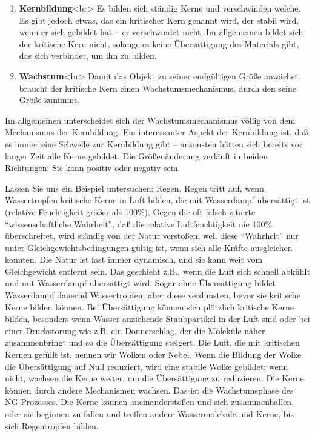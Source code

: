 \begin{enumerate}[label={\arabic*.}] 
\item \textbf{Kernbildung}<br>
Es bilden sich ständig Kerne und verschwinden welche.
Es gibt jedoch etwas, das ein kritischer Kern genannt wird, der stabil wird, wenn er sich gebildet hat -- er verschwindet nicht.
Im allgemeinen bildet sich der kritische Kern nicht, solange es keine Übersättigung des Materials gibt, das sich verbindet, um ihn zu bilden.

\item \textbf{Wachstum}<br>
Damit das Objekt zu seiner endgültigen Größe anwächst, braucht der kritische Kern einen Wachstumsmechanismus, durch den seine Größe zunimmt.
\end{enumerate}

Im allgemeinen unterscheidet sich der Wachstumsmechanismus völlig von dem Mechanismus der Kernbildung.
Ein interessanter Aspekt der Kernbildung ist, daß es immer eine Schwelle zur Kernbildung gibt -- ansonsten hätten sich bereits vor langer Zeit alle Kerne gebildet.
Die Größenänderung verläuft in beiden Richtungen: Sie kann positiv oder negativ sein.

Lassen Sie uns ein Beispiel untersuchen: Regen.
Regen tritt auf, wenn Wassertropfen kritische Kerne in Luft bilden, die mit Wasserdampf übersättigt ist (relative Feuchtigkeit größer als 100\%).
Gegen die oft falsch zitierte \enquote{wissenschaftliche Wahrheit}, daß die relative Luftfeuchtigkeit nie 100\% überschreitet, wird ständig von der Natur verstoßen, weil diese \enquote{Wahrheit} nur unter Gleichgewichtsbedingungen gültig ist, wenn sich alle Kräfte ausgleichen konnten.
Die Natur ist fast immer dynamisch, und sie kann weit vom Gleichgewicht entfernt sein.
Das geschieht z.B., wenn die Luft sich schnell abkühlt und mit Wasserdampf übersättigt wird.
Sogar ohne Übersättigung bildet Wasserdampf dauernd Wassertropfen, aber diese verdunsten, bevor sie kritische Kerne bilden können.
Bei Übersättigung können sich plötzlich kritische Kerne bilden, besonders wenn Wasser anziehende Staubpartikel in der Luft sind oder bei einer Druckstörung wie z.B. ein Donnerschlag, der die Moleküle näher zusammenbringt und so die Übersättigung steigert.
Die Luft, die mit kritischen Kernen gefüllt ist, nennen wir Wolken oder Nebel.
Wenn die Bildung der Wolke die Übersättigung auf Null reduziert, wird eine stabile Wolke gebildet; wenn nicht, wachsen die Kerne weiter, um die Übersättigung zu reduzieren.
Die Kerne können durch andere Mechanismen wachsen.
Das ist die Wachstumsphase des NG-Prozesses.
Die Kerne können aneinanderstoßen und sich zusammenballen, oder sie beginnen zu fallen und treffen andere Wassermoleküle und Kerne, bis sich Regentropfen bilden.

